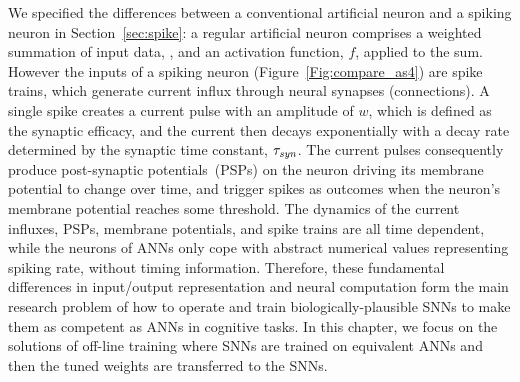 	We specified the differences between a conventional artificial neuron and a spiking neuron in Section~\ref{sec:spike}: a regular artificial neuron comprises a weighted summation of input data, \DIFdelbegin {}\DIFdelend \DIFaddbegin {}\DIFaddend , and an activation function, $f$, applied to the sum\DIFaddbegin {}\DIFaddend .
	However the inputs of a spiking neuron (Figure~\ref{Fig:compare_as4}) are spike trains, which generate current influx through neural synapses (connections).
	A single spike creates a current pulse with an amplitude of $w$, which is defined as the synaptic efficacy, and the current then decays exponentially with a decay rate determined by the synaptic time constant, $\tau_{\textit{\textrm{syn}}}$.
	The current pulses consequently produce post-synaptic potentials~(PSPs) on the neuron driving its membrane potential to change over time, and trigger spikes as outcomes when the neuron's membrane potential reaches some threshold.
	The dynamics of the current influxes, PSPs, membrane potentials, and spike trains are all time dependent, while the neurons of ANNs only cope with abstract numerical values representing spiking rate, without timing information.
	Therefore, these fundamental differences in input/output representation and neural computation form the main research problem of how to operate and train biologically-plausible SNNs to make them as competent as ANNs in cognitive tasks.
	In this chapter, we focus on the solutions of off-line training where SNNs are trained on equivalent ANNs and then the tuned weights are transferred to the SNNs.

